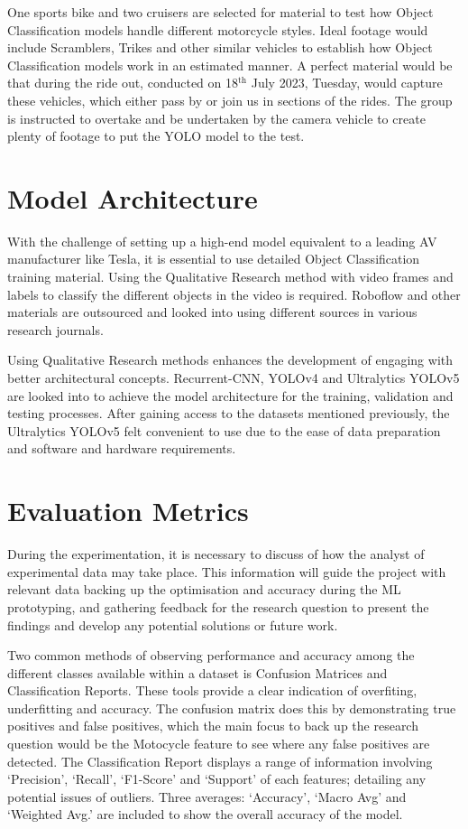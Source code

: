 \documentclass[12pt]{report} %
\begin{document}
		One sports bike and two cruisers are selected for material to test how Object Classification models handle different motorcycle styles. Ideal footage would include Scramblers, Trikes and other similar vehicles to establish how Object Classification models work in an estimated manner. A perfect material would be that during the ride out, conducted on 18$^\text{th}$ July 2023, Tuesday, would capture these vehicles, which either pass by or join us in sections of the rides. The group is instructed to overtake and be undertaken by the camera vehicle to create plenty of footage to put the YOLO model to the test.

	\section{Model Architecture}
		With the challenge of setting up a high-end model equivalent to a leading AV manufacturer like Tesla, it is essential to use detailed Object Classification training material. Using the Qualitative Research method with video frames and labels to classify the different objects in the video is required. Roboflow and other materials are outsourced and looked into using different sources in various research journals. 
			
		Using Qualitative Research methods enhances the development of engaging with better architectural concepts. Recurrent-CNN, YOLOv4 and Ultralytics YOLOv5 are looked into to achieve the model architecture for the training, validation and testing processes. After gaining access to the datasets mentioned previously, the Ultralytics YOLOv5 felt convenient to use due to the ease of data preparation and software and hardware requirements.

	\section{Evaluation Metrics}
        During the experimentation, it is necessary to discuss of how the analyst of experimental data may take place. This information will guide the project with relevant data backing up the optimisation and accuracy during the ML prototyping, and gathering feedback for the research question to present the findings and develop any potential solutions or future work.

        Two common methods of observing performance and accuracy among the different classes available within a dataset is Confusion Matrices and Classification Reports. These tools provide a clear indication of overfiting, underfitting and accuracy. The confusion matrix does this by demonstrating true positives and false positives, which the main focus to back up the research question would be the Motocycle feature to see where any false positives are detected. The Classification Report displays a range of information involving `Precision', `Recall', `F1-Score' and `Support' of each features; detailing any potential issues of outliers. Three averages: `Accuracy', `Macro Avg' and `Weighted Avg.' are included to show the overall accuracy of the model.~\cite{liang_confusion_2022}~\cite{panigrahi_deep_2018}
\end{document}
